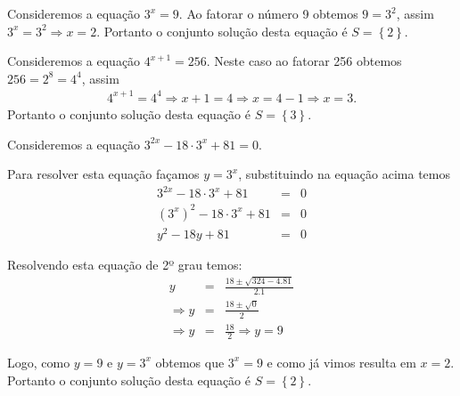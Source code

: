 
\begin{exem}
 Consideremos a equação $3^x= 9$. Ao fatorar o número 9 obtemos $9= 3^2$, assim $3^x= 3^2 \Rightarrow x= 2$. Portanto o conjunto solução desta equação é $S= \left\{ 2 \right\}$.
\end{exem}

\begin{exem}
 Consideremos a equação $4^{x+1}= 256$.  Neste caso ao fatorar 256 obtemos $256=2^8 =4^4$, assim
 \begin{eqnarray*}
 4^{x+1}= 4^4 \Rightarrow x+1= 4 \Rightarrow x= 4-1 \Rightarrow x=3.
 \end{eqnarray*}
 Portanto o conjunto solução desta equação é $S= \left\{ 3 \right\}$.
\end{exem}

\begin{exem}
 Consideremos a equação $3^{2x}- 18\cdot 3^x + 81=0$.

 Para resolver esta equação façamos $y= 3^x$, substituindo na equação acima temos
 \begin{eqnarray*}
  3^{2x} - 18\cdot 3^x + 81&=& 0 \\
  (3^x)^2 - 18\cdot 3^x + 81&=& 0 \\
  y^2 - 18y + 81 &=& 0
 \end{eqnarray*}

 Resolvendo esta equação de 2º grau temos:
 \begin{eqnarray*}
  y &=& \frac{18 \pm \sqrt{324 - 4.81}}{2.1} \\
  \Rightarrow y&=& \frac{18 \pm \sqrt{0}}{2} \\
  \Rightarrow y&=& \frac{18}{2} \Rightarrow y= 9
 \end{eqnarray*}

 Logo, como $y= 9$ e $y= 3^x$ obtemos que $3^x= 9$ e como já vimos resulta em $x= 2$. Portanto o conjunto solução desta equação é $S= \left\{ 2 \right\}$.
\end{exem}



